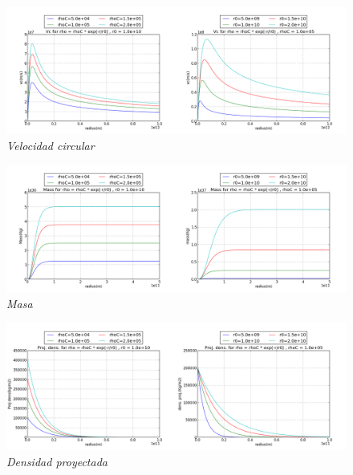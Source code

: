 \documentclass[12pt]{book}
\begin{document}
\begin{description}
\item

\begin{figure}[!ht]
 \centering
 \includegraphics[scale=0.33]{vcFinal.png}
 \caption{\emph{Velocidad circular}}
\end{figure}

\item

\begin{figure}[!ht]
 \centering
 \includegraphics[scale=0.33]{massFinal.png}
 \caption{\emph{Masa}}
\end{figure}

\item

\begin{figure}[!ht]
 \centering
 \includegraphics[scale=0.33]{dpFinal.png}
 \caption{\emph{Densidad proyectada}}
\end{figure}

\end{description}
\end{document}
